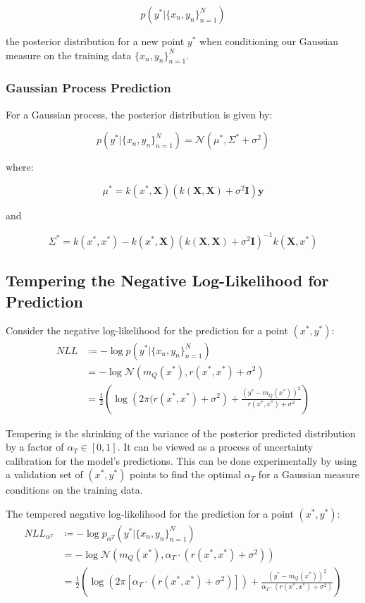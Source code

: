 \documentclass[twoside,11pt]{article}
\begin{document}
\[p(y^*|\{x_n, y_n\}_{n=1}^N)\]

the posterior distribution for a new point $y^*$ when conditioning our Gaussian measure on the training data $\{x_n, y_n\}_{n=1}^N$.

\subsubsection{Gaussian Process Prediction}

For a Gaussian process, the posterior distribution is given by:

\[p(y^*|\{x_n, y_n\}_{n=1}^N) = \mathcal{N}(\mu^*, \Sigma^* + \sigma^2)\]

where:

\[\mu^* = k(x^*, \mathbf{X}) \left(k(\mathbf{X}, \mathbf{X}) + \sigma^2\mathbf{I}\right) \mathbf{y}\]

and

\[\Sigma^* = k(x^*, x^*) - k(x^*, \mathbf{X})\left(k(\mathbf{X}, \mathbf{X}) + \sigma^2\mathbf{I}\right)^{-1} k(\mathbf{X}, x^*)\]


\subsection{Tempering the Negative Log-Likelihood for Prediction}\label{subsec:gwi-for-regression-tempering}

Consider the negative log-likelihood for the prediction for a point $(x^*, y^*)$:
\begin{align*}
    NLL &\coloneqq - \log p(y^*|\{x_n, y_n\}_{n=1}^N)\\
    &= - \log \mathcal{N} \left( m_Q(x^*), r(x^*, x^*) + \sigma^2\right)\\
    &= \frac{1}{2} \left( \log\left(2\pi(r(x^*, x^*)+\sigma^2\right) + \frac{(y^*-m_Q(x^*))^2}{r(x^*, x^*) + \sigma^2}\right)
    \end{align*}

Tempering is the shrinking of the variance of the posterior predicted distribution by a factor of $\alpha_T \in [0, 1]$.
It can be viewed as a process of uncertainty calibration for the model's predictions.
This can be done experimentally by using a validation set of $(x^*, y^*)$ points to find the optimal $\alpha_T$ for a Gaussian measure conditions on the training data.

The tempered negative log-likelihood for the prediction for a point $(x^*, y^*)$:
\begin{align*}
    NLL_{\alpha^{T}} &\coloneqq - \log p_{\alpha^T}(y^*|\{x_n, y_n\}_{n=1}^N)\\
    &= - \log \mathcal{N} \left( m_Q(x^*), \alpha_T \cdot (r(x^*, x^*) + \sigma^2)\right)\\
    &= \frac{1}{2} \left( \log\left(2\pi \left[ \alpha_T \cdot (r(x^*, x^*)+\sigma^2)\right]\right) + \frac{(y^*-m_Q(x^*))^2}{\alpha_T\cdot (r(x^*, x^*) + \sigma^2)}\right)
    \end{align*}
\end{document}
